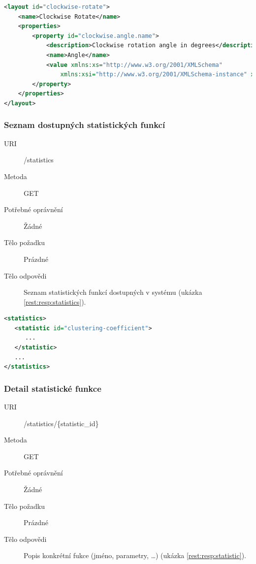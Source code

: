 \documentclass[thesis=M,czech]{FITthesis}[2014/05/6]
\begin{document}
\begin{lstlisting}[caption=Tělo odpovědi zdroje /layouts/\{layout\_id\} (GET), label=rest:resp:layout, language=xml]
<layout id="clockwise-rotate">
    <name>Clockwise Rotate</name>
    <properties>
        <property id="clockwise.angle.name">
            <description>Clockwise rotation angle in degrees</description>
            <name>Angle</name>            
            <value xmlns:xs="http://www.w3.org/2001/XMLSchema"
                xmlns:xsi="http://www.w3.org/2001/XMLSchema-instance" xsi:type="xs:double">90.0</value>
        </property>
    </properties>   
</layout>
\end{lstlisting}    

\subsubsection{Seznam dostupných statistických funkcí}
\begin{description}
  \item[URI] /statistics
  \item[Metoda] GET
  \item[Potřebné oprávnění] Žádné
  \item[Tělo požadku] Prázdné
  \item[Tělo odpovědi] Seznam statistických funkcí dostupných v systému (ukázka \ref{rest:resp:statistics}).
\end{description}

\begin{lstlisting}[caption=Tělo odpovědi zdroje /statistics (GET), label=rest:resp:statistics, language=xml]
<statistics>
   <statistic id="clustering-coefficient">
      ...
   </statistic>
   ...
</statistics>
\end{lstlisting}  

\subsubsection{Detail statistické funkce}
\begin{description}
  \item[URI] /statistics/\{statistic\_id\}
  \item[Metoda] GET
  \item[Potřebné oprávnění] Žádné
  \item[Tělo požadku] Prázdné
  \item[Tělo odpovědi] Popis konkrétní fukce (jméno, parametry, \ldots) (ukázka \ref{rest:resp:statistic}).
\end{description}
\end{document}
